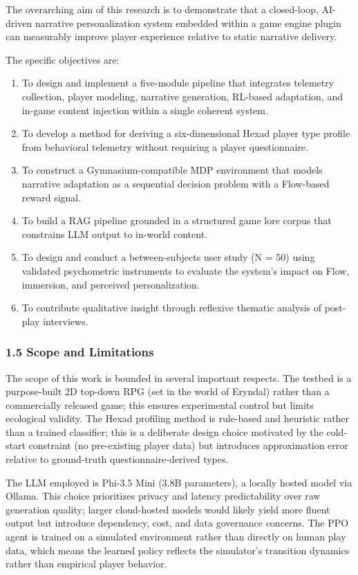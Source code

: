 The overarching aim of this research is to demonstrate that a
closed-loop, AI-driven narrative personalization system embedded within
a game engine plugin can measurably improve player experience relative
to static narrative delivery.

The specific objectives are:

\begin{enumerate}
\def\labelenumi{\arabic{enumi}.}
\tightlist
\item
  To design and implement a five-module pipeline that integrates
  telemetry collection, player modeling, narrative generation, RL-based
  adaptation, and in-game content injection within a single coherent
  system.
\item
  To develop a method for deriving a six-dimensional Hexad player type
  profile from behavioral telemetry without requiring a player
  questionnaire.
\item
  To construct a Gymnasium-compatible MDP environment that models
  narrative adaptation as a sequential decision problem with a
  Flow-based reward signal.
\item
  To build a RAG pipeline grounded in a structured game lore corpus that
  constrains LLM output to in-world content.
\item
  To design and conduct a between-subjects user study (N = 50) using
  validated psychometric instruments to evaluate the system's impact on
  Flow, immersion, and perceived personalization.
\item
  To contribute qualitative insight through reflexive thematic analysis
  of post-play interviews.
\end{enumerate}

\subsubsection{1.5 Scope and Limitations}\label{scope-and-limitations}

The scope of this work is bounded in several important respects. The
testbed is a purpose-built 2D top-down RPG (set in the world of Eryndal)
rather than a commercially released game; this ensures experimental
control but limits ecological validity. The Hexad profiling method is
rule-based and heuristic rather than a trained classifier; this is a
deliberate design choice motivated by the cold-start constraint (no
pre-existing player data) but introduces approximation error relative to
ground-truth questionnaire-derived types.

The LLM employed is Phi-3.5 Mini (3.8B parameters), a locally hosted
model via Ollama. This choice prioritizes privacy and latency
predictability over raw generation quality; larger cloud-hosted models
would likely yield more fluent output but introduce dependency, cost,
and data governance concerns. The PPO agent is trained on a simulated
environment rather than directly on human play data, which means the
learned policy reflects the simulator's transition dynamics rather than
empirical player behavior.

